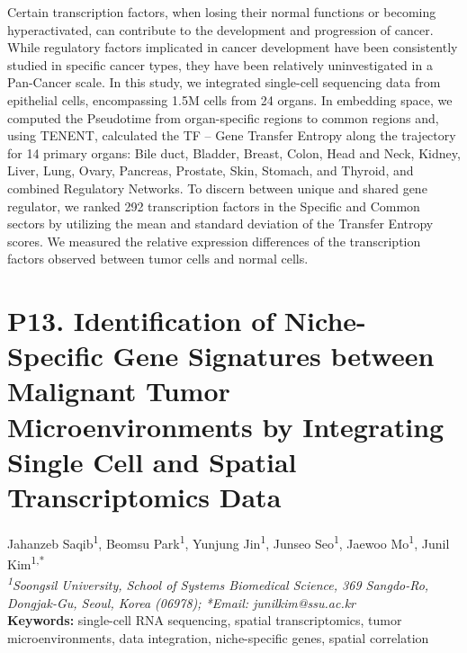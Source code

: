 \noindent
Certain transcription factors, when losing their normal functions or becoming hyperactivated, can contribute to the development and progression of cancer. While regulatory factors implicated in cancer development have been consistently studied in specific cancer types, they have been relatively uninvestigated in a Pan-Cancer scale. In this study, we integrated single-cell sequencing data from epithelial cells, encompassing 1.5M cells from 24 organs. In embedding space, we computed the Pseudotime from organ-specific regions to common regions and, using TENENT, calculated the TF – Gene Transfer Entropy along the trajectory for 14 primary organs: Bile duct, Bladder, Breast, Colon, Head and Neck, Kidney, Liver, Lung, Ovary, Pancreas, Prostate, Skin, Stomach, and Thyroid, and combined Regulatory Networks. To discern between unique and shared gene regulator, we ranked 292 transcription factors in the Specific and Common sectors by utilizing the mean and standard deviation of the Transfer Entropy scores. We measured the relative expression differences of the transcription factors observed between tumor cells and normal cells.
\newpage

\section*{P13. Identification of Niche-Specific Gene Signatures between Malignant Tumor Microenvironments by Integrating Single Cell and Spatial Transcriptomics Data}

\begin{center}
Jahanzeb Saqib\textsuperscript{1}, Beomsu Park\textsuperscript{1}, Yunjung Jin\textsuperscript{1}, Junseo Seo\textsuperscript{1}, Jaewoo Mo\textsuperscript{1}, Junil Kim\textsuperscript{1,*} \\
\vspace{0.2cm}
\textit{\textsuperscript{1}Soongsil University, School of Systems Biomedical Science, 369 Sangdo-Ro, Dongjak-Gu, Seoul, Korea (06978); *Email: junilkim@ssu.ac.kr} \\
\vspace{0.2cm}
\textbf{Keywords:} single-cell RNA sequencing, spatial transcriptomics, tumor microenvironments, data integration, niche-specific genes, spatial correlation
\end{center}

